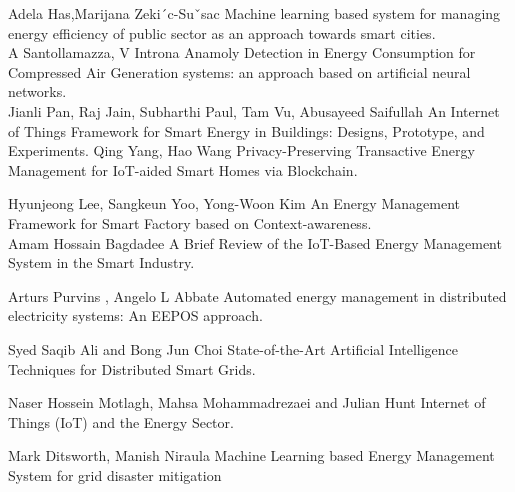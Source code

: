 \documentclass[12 pt]{report}
\begin{document}
\newpage
{}
\renewcommand\bibname{References}
\begin{thebibliography}{21}

Adela Has,Marijana Zeki´c-Suˇsac Machine learning based system for managing energy efficiency of public sector as an approach towards smart cities.\\

A Santollamazza, V Introna Anamoly Detection in Energy Consumption for Compressed Air Generation systems: an approach based on artificial neural networks.\\

Jianli Pan, Raj Jain, Subharthi Paul, Tam Vu, Abusayeed Saifullah An Internet of Things Framework for Smart Energy in Buildings: Designs, Prototype, and Experiments.
Qing Yang, Hao Wang Privacy-Preserving Transactive Energy Management
for IoT-aided Smart Homes via Blockchain.

Hyunjeong Lee, Sangkeun Yoo, Yong-Woon Kim An Energy Management Framework for Smart Factory based on Context-awareness.\\

Amam Hossain Bagdadee A Brief Review of the IoT-Based Energy Management System in the Smart Industry.

Arturs Purvins , Angelo L Abbate Automated energy management in distributed electricity systems: An EEPOS approach.

Syed Saqib Ali and Bong Jun Choi State-of-the-Art Artificial Intelligence Techniques for Distributed Smart Grids.

Naser Hossein Motlagh, Mahsa Mohammadrezaei and Julian Hunt Internet of Things (IoT) and the Energy Sector.

Mark Ditsworth, Manish Niraula Machine Learning based Energy Management System for grid disaster
mitigation
\end{thebibliography}
\end{document}
